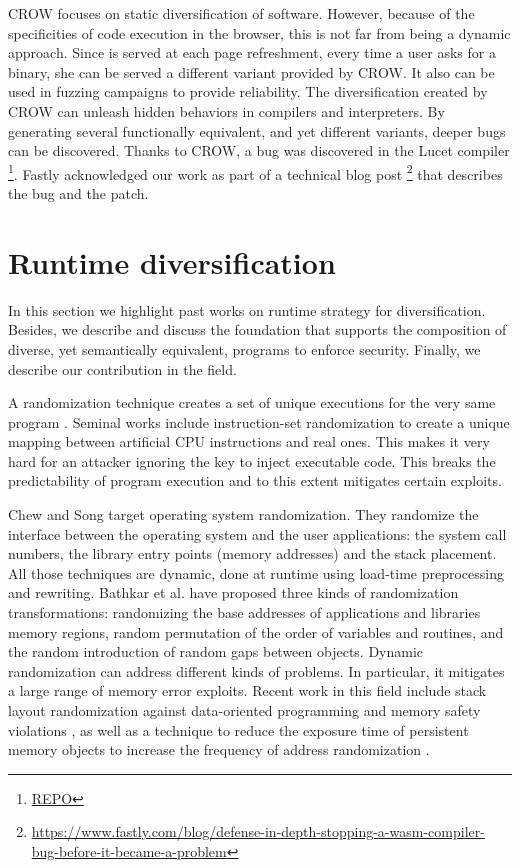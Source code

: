 CROW focuses on static diversification of software. However, because of the specificities of code execution in the browser, this is not far from being a dynamic approach. Since \wasm is served at each page refreshment, every time a user asks for a \wasm binary, she can be served a different variant provided by CROW.
It also can be used in fuzzing campaigns \citationneeded to provide reliability. The diversification created by CROW can unleash hidden behaviors in compilers and interpreters.
By generating several functionally equivalent, and yet different variants, deeper bugs can be discovered. 
Thanks to CROW, a bug was discovered in the Lucet compiler \footnote{\url{REPO}}.
Fastly acknowledged our work as part of a technical blog post 
\footnote{\url{https://www.fastly.com/blog/defense-in-depth-stopping-a-wasm-compiler-bug-before-it-became-a-problem}} that describes the bug and the patch. 

\section{Runtime diversification}
\label{sota:randomization}

In this section we highlight past works on runtime strategy for diversification. Besides, we describe and discuss the foundation that supports the composition of diverse, yet semantically equivalent, programs to enforce security. Finally, we describe our contribution in the field.


A randomization technique creates a set of unique executions for the very same program \cite{bhatkar03}. Seminal works include instruction-set randomization \cite{Kc03,barrantes2003randomized}
to create a unique mapping between artificial CPU instructions and real ones. This makes  it very hard for an attacker ignoring the key to inject executable code. This breaks the predictability of program execution and to this extent mitigates certain exploits.


Chew and Song \cite{Chew02mitigatingbuffer} target operating system randomization. They randomize the interface between the operating system and the user applications:
the system call numbers, the library entry points (memory addresses) and the stack placement. All those techniques are dynamic, done at runtime using load-time preprocessing and rewriting. 
Bathkar et al. \cite{bhatkar03,bhatkar2005efficient} have proposed  three kinds of randomization transformations: randomizing the base addresses of applications and libraries  memory regions, random permutation of the order of variables and routines, and the random introduction of random gaps between objects. 
Dynamic randomization can address different kinds of problems. In particular, it  mitigates a large range of memory error exploits. 
Recent work in this field include stack layout randomization against data-oriented programming \cite{aga2019smokestack} and memory safety violations \cite{lee2021savior}, as well as a technique to reduce the exposure time of persistent memory objects to increase the frequency of address randomization \cite{xu2020merr}.




